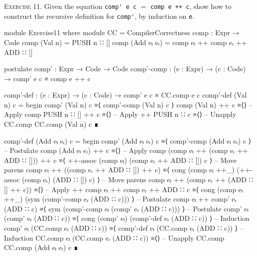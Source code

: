 \documentclass{article}
\begin{document}
\noindent
\textsc{Exercise 11.} Given the equation \verb!comp' e c! $=$ \verb!comp e ++ c!, show how to construct the recursive definition for \verb!comp'!, by induction on \texttt{e}.

\begin{code}
module Exercise11 where
  module CC = CompilerCorrectness
  comp : Expr → Code
  comp (Val n) = PUSH n ∷ []
  comp (Add eₗ eᵣ) = comp eₗ ++ comp eᵣ ++ ADD ∷ []
\end{code}
\begin{code}
  postulate
    comp' : Expr → Code → Code
    comp'-comp : (e : Expr) → (c : Code) → comp' e c ≡ comp e ++ c
\end{code}
\begin{code}
  comp'-def : (e : Expr) → (c : Code) → comp' e c ≡ CC.comp e c
  comp'-def (Val n) c =
    begin
      comp' (Val n) c
    ≡⟨ comp'-comp (Val n) c ⟩
      comp (Val n) ++ c
    ≡⟨⟩ -- Apply comp
      PUSH n ∷ [] ++ c
    ≡⟨⟩ -- Apply ++
      PUSH n ∷ c
    ≡⟨⟩ -- Unapply CC.comp
      CC.comp (Val n) c
    ∎
\end{code}
\begin{code}
  comp'-def (Add eₗ eᵣ) c =
    begin
      comp' (Add eₗ eᵣ) c
    ≡⟨ comp'-comp (Add eₗ eᵣ) c ⟩ -- Postulate
      comp (Add eₗ eᵣ) ++ c
    ≡⟨⟩ -- Apply comp
      (comp eₗ ++ (comp eᵣ ++ ADD ∷ [])) ++ c
    ≡⟨ ++-assoc (comp eₗ) (comp eᵣ ++ ADD ∷ []) c ⟩ -- Move parens
      comp eₗ ++ ((comp eᵣ ++ ADD ∷ []) ++ c)
    ≡⟨ cong (comp eₗ ++_) (++-assoc (comp eᵣ) (ADD ∷ []) c) ⟩ -- Move parens
      comp eₗ ++ (comp eᵣ ++ (ADD ∷ [] ++ c))
    ≡⟨⟩ -- Apply ++
      comp eₗ ++ comp eᵣ ++ ADD ∷ c
    ≡⟨ cong (comp eₗ ++_) (sym (comp'-comp eᵣ (ADD ∷ c))) ⟩ -- Postulate
      comp eₗ ++ comp' eᵣ (ADD ∷ c)
    ≡⟨ sym (comp'-comp eₗ (comp' eᵣ (ADD ∷ c))) ⟩ -- Postulate
      comp' eₗ (comp' eᵣ (ADD ∷ c))
    ≡⟨ cong (comp' eₗ) (comp'-def eᵣ (ADD ∷ c)) ⟩ -- Induction
      comp' eₗ (CC.comp eᵣ (ADD ∷ c))
    ≡⟨ comp'-def eₗ (CC.comp eᵣ (ADD ∷ c)) ⟩ -- Induction
      CC.comp eₗ (CC.comp eᵣ (ADD ∷ c))
    ≡⟨⟩ -- Unapply CC.comp
      CC.comp (Add eₗ eᵣ) c
    ∎
\end{code}
\end{document}
